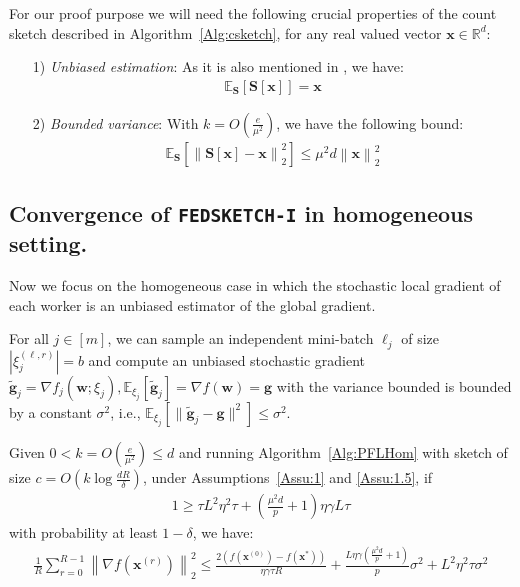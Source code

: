 \begin{property}
For our proof purpose we will need the following crucial properties of the count sketch described in Algorithm~\ref{Alg:csketch}, for any real valued vector $\mathbf{x}\in \mathbb{R}^{d}$:
\begin{itemize}
    \item[1)] \emph{Unbiased estimation}: As it is also mentioned in \cite{li2019privacy}, we have:
    \begin{align}
        \mathbb{E}_{\mathbf{S}}\left[\mathbf{S}\left[\mathbf{x}\right]\right]=\mathbf{x}
    \end{align}
    \item[2)] \emph{Bounded variance}: With $k=O\left(\frac{e}{\mu^2}\right)$, we have the following bound:
    \begin{align}
        \mathbb{E}_{\mathbf{S}}\left[\left\|\mathbf{S}\left[\mathbf{x}\right]-\mathbf{x}\right\|_2^2\right]\leq \mu^2 d\left\|\mathbf{x}\right\|_2^2
    \end{align}
\end{itemize}
\end{property}


\subsection{Convergence of  \texttt{FEDSKETCH-I} in homogeneous setting.} 
Now we focus on the homogeneous case in which the stochastic local gradient of each worker is an unbiased estimator of the global gradient.


\begin{assumption}\label{Assu:1.5}
For all $j\in [m]$, we can sample an independent mini-batch $\ell_j$   of size $|\xi_j^{(\ell,r)}| = b$ and compute an unbiased stochastic gradient  $\tilde{\mathbf{g}}_j = \nabla f_j(\boldsymbol{w}; \xi_j), \mathbb{E}_{\xi_j}[\tilde{\mathbf{g}}_j] = \nabla f(\boldsymbol{w})=\mathbf{g}$ with  the variance bounded is bounded by a constant $\sigma^2$, i.e., $
\mathbb{E}_{\xi_j}\left[\|\tilde{\mathbf{g}}_j-\mathbf{g}\|^2\right]\leq \sigma^2$.
\end{assumption}


\begin{theorem}
Given $0<k=O\left(\frac{e}{\mu^2}\right)\leq d$
and running Algorithm~\ref{Alg:PFLHom} with sketch of size $c=O\left(k\log \frac{d R}{\delta}\right)$,  under Assumptions~\ref{Assu:1} and \ref{Assu:1.5}, if 
\begin{align}
   1\geq {\tau L^2\eta^2\tau}+(\frac{\mu^2 d}{p}+1)\eta\gamma L{\tau}\label{eq:cnd-lrs-h} 
\end{align}
with probability at least $1-\delta$, we have:
\begin{align}\label{eq:thm1-result}
    \frac{1}{R}\sum_{r=0}^{R-1}\left\|\nabla f({\boldsymbol{x}}^{(r)})\right\|_2^2\leq \frac{2\left(f(\boldsymbol{x}^{(0)})-f(\boldsymbol{x}^{*})\right)}{\eta\gamma\tau R}+\frac{L\eta\gamma(\frac{\mu^2 d}{p}+1)}{p}\sigma^2+{L^2\eta^2\tau }\sigma^2
\end{align}
\end{theorem}


